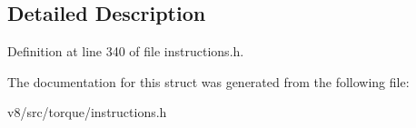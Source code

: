 \subsection{Detailed Description}


Definition at line 340 of file instructions.\+h.



The documentation for this struct was generated from the following file\+:\begin{DoxyCompactItemize}
\item 
v8/src/torque/instructions.\+h\end{DoxyCompactItemize}

